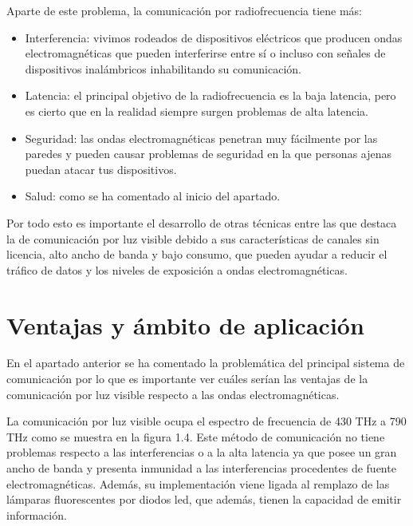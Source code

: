 Aparte de este problema, la comunicación por radiofrecuencia tiene más: \cite{khan}

\begin{itemize}
    \item Interferencia: vivimos rodeados de dispositivos eléctricos que producen ondas electromagnéticas que pueden interferirse entre sí o incluso con señales de dispositivos inalámbricos inhabilitando su comunicación.
    \item Latencia: el principal objetivo de la radiofrecuencia es la baja latencia, pero es cierto que en la realidad siempre surgen problemas de alta latencia.
    \item Seguridad: las ondas electromagnéticas penetran muy fácilmente por las paredes y pueden causar problemas de seguridad en la que personas ajenas puedan atacar tus dispositivos.
    \item Salud: como se ha comentado al inicio del apartado.
\end{itemize}

Por todo esto es importante el desarrollo de otras técnicas entre las que destaca la de comunicación por luz visible debido a sus características de canales sin licencia, alto ancho de banda y bajo consumo, que pueden ayudar a reducir el tráfico de datos y los niveles de exposición a ondas electromagnéticas.

\section{Ventajas y ámbito de aplicación}

En el apartado anterior se ha comentado la problemática del principal sistema de comunicación por lo que es importante ver cuáles serían las ventajas de la comunicación por luz visible respecto a las ondas electromagnéticas.

La comunicación por luz visible ocupa el espectro de frecuencia de 430 THz a 790 THz como se muestra en la figura 1.4. Este método de comunicación no tiene problemas respecto a las interferencias o a la alta latencia ya que posee un gran ancho de banda y presenta inmunidad a las interferencias procedentes de fuente electromagnéticas. Además, su implementación viene ligada al remplazo de las lámparas fluorescentes por diodos led, que además, tienen la capacidad de emitir información. \cite{khan}

